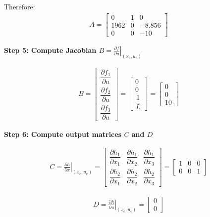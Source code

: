 \documentclass[11pt,a4paper]{article}
\begin{document}
Therefore:
\begin{align}
A = \begin{bmatrix}
0 & 1 & 0\\
1962 & 0 & -8.856\\
0 & 0 & -10
\end{bmatrix}
\end{align}

\textbf{Step 5: Compute Jacobian $B = \left.\frac{\partial f}{\partial u}\right|_{(x_e,u_e)}$}

\begin{align}
B = \begin{bmatrix}
\dfrac{\partial f_1}{\partial u}\\[0.3em]
\dfrac{\partial f_2}{\partial u}\\[0.3em]
\dfrac{\partial f_3}{\partial u}
\end{bmatrix} = \begin{bmatrix}
0\\[0.2em]
0\\[0.2em]
\dfrac{1}{L}
\end{bmatrix} = \begin{bmatrix}
0\\
0\\
10
\end{bmatrix}
\end{align}

\textbf{Step 6: Compute output matrices $C$ and $D$}

\begin{align}
C = \left.\frac{\partial h}{\partial x}\right|_{(x_e,u_e)} = \begin{bmatrix}
\dfrac{\partial h_1}{\partial x_1} & \dfrac{\partial h_1}{\partial x_2} & \dfrac{\partial h_1}{\partial x_3}\\[0.3em]
\dfrac{\partial h_2}{\partial x_1} & \dfrac{\partial h_2}{\partial x_2} & \dfrac{\partial h_2}{\partial x_3}
\end{bmatrix} = \begin{bmatrix}
1 & 0 & 0\\
0 & 0 & 1
\end{bmatrix}
\end{align}

\begin{align}
D = \left.\frac{\partial h}{\partial u}\right|_{(x_e,u_e)} = \begin{bmatrix}
0\\
0
\end{bmatrix}
\end{align}
\end{document}
